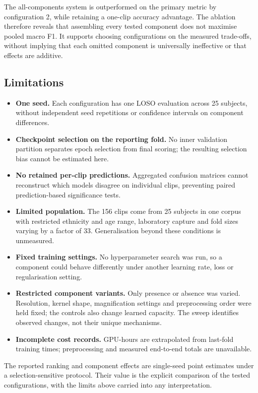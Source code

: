 The all-components system is outperformed on the primary metric by configuration 2, while retaining a one-clip accuracy advantage. The ablation therefore reveals that assembling every tested component does not maximise pooled macro F1. It supports choosing configurations on the measured trade-offs, without implying that each omitted component is universally ineffective or that effects are additive.

\subsection{Limitations}
\label{sec:ch5-limitations}

\begin{itemize}
    \item \textbf{One seed.} Each configuration has one LOSO evaluation across 25 subjects, without independent seed repetitions or confidence intervals on component differences.
    \item \textbf{Checkpoint selection on the reporting fold.} No inner validation partition separates epoch selection from final scoring; the resulting selection bias cannot be estimated here.
    \item \textbf{No retained per-clip predictions.} Aggregated confusion matrices cannot reconstruct which models disagree on individual clips, preventing paired prediction-based significance tests.
    \item \textbf{Limited population.} The 156 clips come from 25 subjects in one corpus with restricted ethnicity and age range, laboratory capture and fold sizes varying by a factor of 33. Generalisation beyond these conditions is unmeasured.
    \item \textbf{Fixed training settings.} No hyperparameter search was run, so a component could behave differently under another learning rate, loss or regularisation setting.
    \item \textbf{Restricted component variants.} Only presence or absence was varied. Resolution, kernel shape, magnification settings and preprocessing order were held fixed; the controls also change learned capacity. The sweep identifies observed changes, not their unique mechanisms.
    \item \textbf{Incomplete cost records.} GPU-hours are extrapolated from last-fold training times; preprocessing and measured end-to-end totals are unavailable.
\end{itemize}

The reported ranking and component effects are single-seed point estimates under a selection-sensitive protocol. Their value is the explicit comparison of the tested configurations, with the limits above carried into any interpretation.
